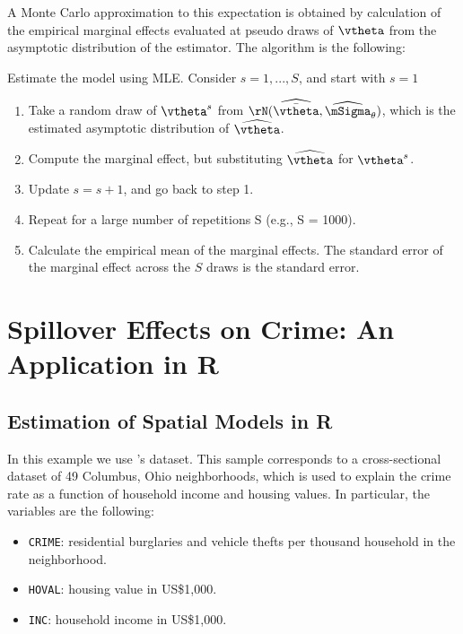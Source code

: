 \documentclass[english,12pt]{book}\usepackage[]{graphicx}\usepackage[]{xcolor}
\begin{document}
A Monte Carlo approximation to this expectation is obtained by calculation of the empirical marginal effects evaluated at pseudo draws of $\vtheta$ from the asymptotic distribution of the estimator. The algorithm is the following:

\begin{algorithm}
Estimate the model using MLE. Consider $s = 1, ..., S$, and start with $s = 1$
\begin{enumerate}
  \item Take a random draw of $\vtheta^{s}$ from $\rN(\widehat{\bar{\vtheta}}, \widehat{\mSigma}_{\theta})$, which is the estimated asymptotic distribution of $\widehat{\vtheta}$. 
 \item Compute the marginal effect, but substituting  $\widehat{\vtheta}$ for $\vtheta^s$. 
 \item Update $s = s + 1$, and go back to step 1. 
 \item Repeat for a large number of repetitions S (e.g., S = 1000).  
 \item Calculate the empirical mean of the marginal effects. The standard error of the marginal effect across the $S$ draws is the standard error. 
\end{enumerate}
\end{algorithm}


\section{Spillover Effects on Crime: An Application in R}\label{sec:Anselin-example}


\subsection{Estimation of Spatial Models in R}

In this example we use \cite{anselin1988spatial}'s dataset. This sample corresponds to a cross-sectional dataset of 49 Columbus, Ohio neighborhoods, which is used to explain the crime rate as  a function of household income and housing values. In particular, the variables  are the following:

\begin{itemize}
  \item \texttt{CRIME}: residential burglaries and vehicle thefts per thousand household in the neighborhood.
  \item \texttt{HOVAL}: housing value in US\$1,000.
  \item \texttt{INC}: household income in US\$1,000.
\end{itemize}
\end{document}
